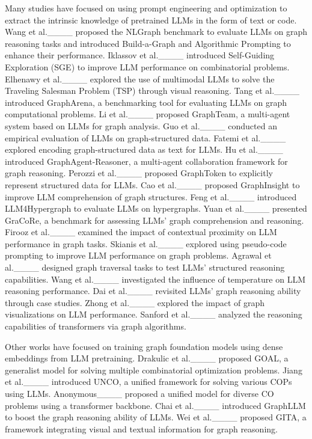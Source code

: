 Many studies have focused on using prompt engineering and optimization to extract the intrinsic knowledge of pretrained LLMs in the form of text or code. Wang et al.____ proposed the NLGraph benchmark to evaluate LLMs on graph reasoning tasks and introduced Build-a-Graph and Algorithmic Prompting to enhance their performance. Iklassov et al.____ introduced Self-Guiding Exploration (SGE) to improve LLM performance on combinatorial problems. Elhenawy et al.____ explored the use of multimodal LLMs to solve the Traveling Salesman Problem (TSP) through visual reasoning. Tang et al.____ introduced GraphArena, a benchmarking tool for evaluating LLMs on graph computational problems. Li et al.____ proposed GraphTeam, a multi-agent system based on LLMs for graph analysis. Guo et al.____ conducted an empirical evaluation of LLMs on graph-structured data. Fatemi et al.____ explored encoding graph-structured data as text for LLMs. Hu et al.____ introduced GraphAgent-Reasoner, a multi-agent collaboration framework for graph reasoning. Perozzi et al.____ proposed GraphToken to explicitly represent structured data for LLMs. Cao et al.____ proposed GraphInsight to improve LLM comprehension of graph structures. Feng et al.____ introduced LLM4Hypergraph to evaluate LLMs on hypergraphs. Yuan et al.____ presented GraCoRe, a benchmark for assessing LLMs' graph comprehension and reasoning. Firooz et al.____ examined the impact of contextual proximity on LLM performance in graph tasks. Skianis et al.____ explored using pseudo-code prompting to improve LLM performance on graph problems. Agrawal et al.____ designed graph traversal tasks to test LLMs' structured reasoning capabilities. Wang et al.____ investigated the influence of temperature on LLM reasoning performance. Dai et al.____ revisited LLMs' graph reasoning ability through case studies. Zhong et al.____ explored the impact of graph visualizations on LLM performance. Sanford et al.____ analyzed the reasoning capabilities of transformers via graph algorithms.

Other works have focused on training graph foundation models using dense embeddings from LLM pretraining. Drakulic et al.____ proposed GOAL, a generalist model for solving multiple combinatorial optimization problems. Jiang et al.____ introduced UNCO, a unified framework for solving various COPs using LLMs. Anonymous____ proposed a unified model for diverse CO problems using a transformer backbone. Chai et al.____ introduced GraphLLM to boost the graph reasoning ability of LLMs. Wei et al.____ proposed GITA, a framework integrating visual and textual information for graph reasoning.


